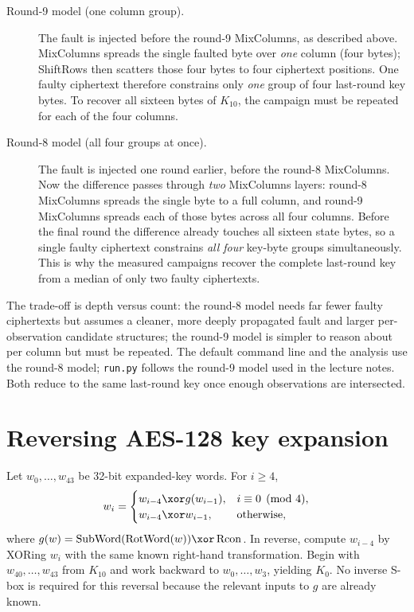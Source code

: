 \begin{description}
\item[Round-9 model (one column group).] The fault is injected before the
round-9 MixColumns, as described above. MixColumns spreads the single faulted
byte over \emph{one} column (four bytes); ShiftRows then scatters those four
bytes to four ciphertext positions. One faulty ciphertext therefore constrains
only \emph{one} group of four last-round key bytes. To recover all sixteen bytes
of \(K_{10}\), the campaign must be repeated for each of the four columns.
\item[Round-8 model (all four groups at once).] The fault is injected one round
earlier, before the round-8 MixColumns. Now the difference passes through
\emph{two} MixColumns layers: round-8 MixColumns spreads the single byte to a
full column, and round-9 MixColumns spreads each of those bytes across all four
columns. Before the final round the difference already touches all sixteen state
bytes, so a single faulty ciphertext constrains \emph{all four} key-byte groups
simultaneously. This is why the measured campaigns recover the complete
last-round key from a median of only two faulty ciphertexts.
\end{description}

\noindent The trade-off is depth versus count: the round-8 model needs far fewer
faulty ciphertexts but assumes a cleaner, more deeply propagated fault and larger
per-observation candidate structures; the round-9 model is simpler to reason
about per column but must be repeated. The default command line and the analysis
use the round-8 model; \texttt{run.py} follows the round-9 model used in the
lecture notes. Both reduce to the same last-round key once enough observations
are intersected.

\section{Reversing AES-128 key expansion}
Let \(w_0,\ldots,w_{43}\) be 32-bit expanded-key words. For \(i\ge4\),
\[w_i=\begin{cases}w_{i-4}\xor g(w_{i-1}),&i\equiv0\pmod4,\\w_{i-4}\xor w_{i-1},&\text{otherwise},\end{cases}\]
where \(g(w)=\operatorname{SubWord}(\operatorname{RotWord}(w))\xor\operatorname{Rcon}\). In reverse, compute \(w_{i-4}\) by XORing \(w_i\) with the same known right-hand transformation. Begin with \(w_{40},\ldots,w_{43}\) from \(K_{10}\) and work backward to \(w_0,\ldots,w_3\), yielding \(K_0\). No inverse S-box is required for this reversal because the relevant inputs to \(g\) are already known.
